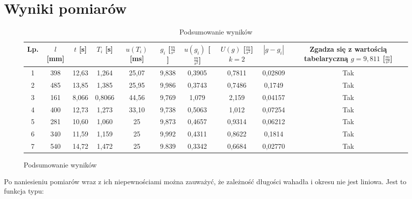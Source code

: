 \documentclass{article}
\begin{document}
\section{Wyniki pomiarów}

\begin{figure}[!htb]
	\begin {table}[H]
	\caption {Podsumowanie wyników} \label{tab} 
	\begin{adjustwidth}{-1cm}{}
		\def\arraystretch{1.3}
		\centering
		\begin{tabular}{|c|c|c|c|c|c|c|c|c|c|}
		
			\hline
			Lp. & $l$ \mbox{[mm]}  & 
			$t$ \mbox{[s]} & $T_{i}$ \mbox{[s]} & $u(T_{i})$ \mbox{[ms]} & $g_{i}$ \mbox{[$\frac{m}{s^2}$]} & $u(g_{i})$ \mbox{[$\frac{m}{s^2}$]} & \makecell{$U(g)$ \mbox{[$\frac{m}{s^2}$]} \\ $k = 2$} & $|g-g_{i}|$  & \makecell{Zgadza się z wartością tabelaryczną \\ $g = 9,811 $  \mbox{[$\frac{m}{s^2}$]}} \\
			\hline
			1 & 398 &
			12,63 & 1,264 & 25,07 & 9,838 & 0,3905 & 0,7811 & 0,02809 & Tak
			\\
			\hline
			2 & 485 
			& 13,85 & 1,385  & 25,95 & 9,986 & 0,3743 & 0,7486 & 0,1749 & Tak
			\\
			\hline
			3 & 161 
			& 8,066 & 0,8066 & 44,56 & 9,769 & 1,079 & 2,159 & 0,04157 & Tak
			\\
			\hline
			4 & 400 
			& 12,73 & 1,273 & 33,10 & 9,738 & 0,5063 & 1,012 & 0,07254 & Tak
			\\
			\hline
			5 & 281 
			& 10,60 & 1,060 & 25 & 9,873 & 0,4657 & 0,9314 & 0,06212 & Tak
			\\
			\hline
			6 & 340 
			& 11,59 & 1,159 & 25 & 9,992 & 0,4311 & 0,8622 &  0,1814 & Tak
			\\
			\hline
			7 & 540 
			& 14,72 & 1,472 & 25 & 9.839 & 0,3342 & 0,6684 & 0,02770 & Tak
			\\
			\hline
		\end{tabular}
	\end{adjustwidth}
\end{table}
\end{figure}
\pagebreak
Po naniesieniu pomiarów wraz z ich niepewnościami można zauważyć, że zależność długości wahadła i okresu nie jest liniowa. Jest to funkcja typu:
\end{document}
